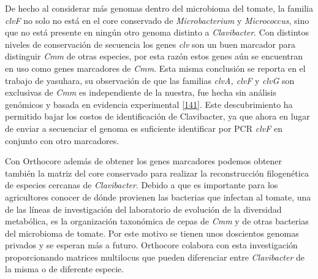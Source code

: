 \documentclass[12pt,twoside]{reedthesis}
\begin{document}
  De hecho al considerar más genomas dentro del microbioma del tomate, la
  familia \emph{clvF} no solo no está en el core conservado de
  \emph{Microbacterium} y \emph{Micrococcus}, sino que no está presente en
  ningún otro genoma distinto a \emph{Clavibacter}. Con distintos niveles
  de conservación de secuencia los genes \emph{clv} son un buen marcador
  para distinguir \emph{Cmm} de otras especies, por esta razón estos genes
  aún se encuentran en uso como genes marcadores de \emph{Cmm}. Esta misma
  conclusión se reporta en el trabajo de yasuhara, su observación de que
  las familias \emph{clvA, clvF} y \emph{clvG} son exclusivas de
  \emph{Cmm} es independiente de la nuestra, fue hecha sin análisis
  genómicos y basada en evidencia experimental
  {[}\protect\hyperlink{ref-yasuhara-bell_genes_2014}{141}{]}. Este
  descubrimiento ha permitido bajar los costos de identificación de
  Clavibacter, ya que ahora en lugar de enviar a secuenciar el genoma es
  suficiente identificar por PCR \emph{clvF} en conjunto con otro
  marcadores.
  
  Con Orthocore además de obtener los genes marcadores podemos obtener
  también la matriz del core conservado para realizar la reconstrucción
  filogenética de especies cercanas de \emph{Clavibacter}. Debido a que es
  importante para los agricultores conocer de dónde provienen las
  bacterias que infectan al tomate, una de las líneas de investigación del
  laboratorio de evolución de la diversidad metabólica, es la organización
  taxonómica de cepas de \emph{Cmm} y de otras bacterias del microbioma de
  tomate. Por este motivo se tienen unos doscientos genomas privados y se
  esperan más a futuro. Orthocore colabora con esta investigación
  proporcionando matrices multilocus que pueden diferenciar entre
  \emph{Clavibacter} de la misma o de diferente especie.
  
\end{document}
